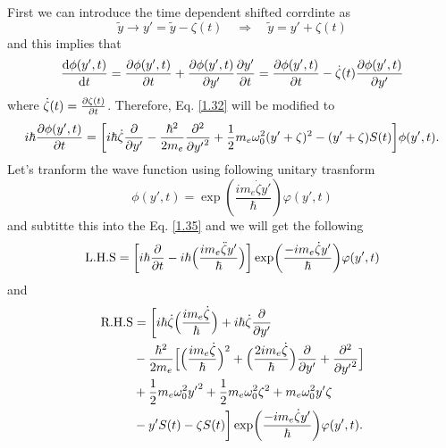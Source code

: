 \noindent
First we can introduce the time dependent shifted corrdinte as
\begin{equation} \label{1.33}
    \tilde{y} \rightarrow y' = \tilde{y} - \zeta(t) \quad \Rightarrow \quad
    \tilde{y} = y' + \zeta(t)
\end{equation}
and this implies that
\begin{equation} \label{1.34}
    \dv{\phi(y',t)}{t} = \pdv{\phi(y',t)}{t} + \pdv{\phi(y',t)}{y'}\pdv{y'}{t} =
    \pdv{\phi(y',t)}{t} - \dot{\zeta}(t)\pdv{\phi(y',t)}{y'}
\end{equation}
where $\dot{\zeta}(t) = \pdv{\zeta(t)}{t}$.
Therefore, Eq. \eqref{1.32} will be modified to
\begin{equation} \label{1.35}
  \begin{aligned}
    i \hbar \pdv{\phi(y',t)}{t}  =
    \bigg[
    i \hbar\dot{\zeta}\pdv{y'}
    -
    \frac{\hbar^2}{2m_e}
    \pdv[2]{{y'}} +
    \frac{1}{2}m_e \omega_0^2(y' + \zeta)^2
    - (y' + \zeta) S(t)
    \bigg]
    \phi(y',t).
  \end{aligned}
\end{equation}
Let's tranform the wave function using following unitary trasnform
\begin{equation} \label{1.36}
    \phi(y',t) = \exp(\frac{im_e\dot{\zeta}y'}{\hbar})\varphi(y',t)
\end{equation}
and subtitte this into the Eq. \eqref{1.35} and we will get the following
\begin{equation} \label{1.37}
  \text{L.H.S} =  \bigg[ i \hbar \pdv{t} -
i \hbar \Big(\frac{im_e \ddot{\zeta} y'}{\hbar}\Big)\bigg]  \exp(\frac{-im_e\dot{\zeta}y'}{\hbar})\varphi(y',t)
\end{equation}
and
\begin{equation} \label{1.38}
  \begin{aligned}
    \text{R.H.S} & =  \bigg[
      i \hbar \dot{\zeta}  \Big(\frac{im_e \dot{\zeta}}{\hbar}\Big)  +
      i \hbar \dot{\zeta} \pdv{y'} \\
      &
      -
      \frac{\hbar^2}{2m_e}\Big[
        \Big(\frac{im_e \dot{\zeta}}{\hbar}\Big)^2
        + \Big(\frac{2im_e \dot{\zeta}}{\hbar}\Big) \pdv{{y'}}
        + \pdv[2]{{y'}}
      \Big] \\
      &
      +\frac{1}{2}m_e\omega_0^2 {y'}^2 + \frac{1}{2}m_e\omega_0^2 \zeta^2 +
      m_e\omega_0^2 y'\zeta \\
      & -
      y'S(t) - \zeta S(t)
    \bigg]  \exp(\frac{-im_e\dot{\zeta}y'}{\hbar})\varphi(y',t).
  \end{aligned}
\end{equation}
